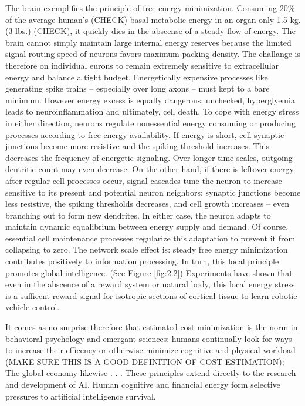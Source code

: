 The brain exemplifies the principle of free energy minimization. Consuming 20\% of the average human's (CHECK) basal metabolic energy in an organ only 1.5 kg. (3 lbs.) (CHECK), it quickly dies in the abscense of a steady flow of energy. The brain cannot simply maintain large internal energy reserves because the limited signal routing speed of neurons favors maximum packing density. The challange is therefore on individual eurons to remain extremely sensitive to extracellular energy and balance a tight budget. Energetically expensive processes like generating spike trains -- especially over long axons -- must kept to a bare minimum. However energy excess is equally dangerous; unchecked, hyperglyemia leads to neuroinflammation and ultimately, cell death. To cope with energy stress in either direction, neurons regulate nonessential energy consuming or producing processes according to free energy availability. If energy is short, cell synaptic junctions become more resistive and the spiking threshold increases. This decreases the frequency of energetic signaling. Over longer time scales, outgoing dentritic count may even decrease. On the other hand, if there is leftover energy after regular cell processes occur, signal cascades tune the neuron to increase sensitive to its present and potential neuron neighbors: synaptic junctions become less resistive, the spiking thresholds decreases, and cell growth increases -- even branching out to form new dendrites. In either case, the neuron adapts to maintain dynamic equalibrium between energy supply and demand. Of course, essential cell maintenance processes regularize this adaptation to prevent it from collapsing to zero. The network scale effect is: steady free energy minimization contributes positively to information processing. In turn, this local principle promotes global intelligence. (See Figure \ref{fig:2.2}) Experiments have shown that even in the abscence of a reward system or natural body, this local energy stress is a sufficent reward signal for isotropic sections of cortical tissue to learn robotic vehicle control. \cite{Vergara2019}

It comes as no surprise therefore that estimated cost minimization is the norm in behavioral psychology and emergant sciences: humans continually look for ways to increase their efficency or otherwise minimize cognitive and physical workload (MAKE SURE THIS IS A GOOD DEFINITION OF COST ESTIMATION); The global economy likewise . . . These principles extend directly to the research and development of AI. Human cognitive and financial energy form selective pressures to artificial intelligence survival.

